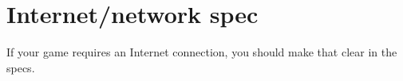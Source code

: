 \section{Internet/network spec} %
If your game requires an Internet connection, you should make that clear in the specs.
